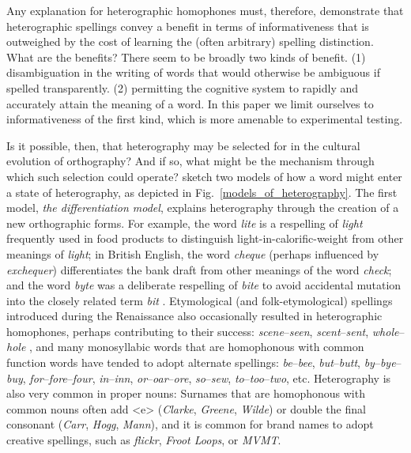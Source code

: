 \documentclass[doc,biblatex]{apa7}
\begin{document}
Any explanation for heterographic homophones must, therefore, demonstrate that heterographic spellings convey a benefit in terms of informativeness that is outweighed by the cost of learning the (often arbitrary) spelling distinction. What are the benefits? There seem to be broadly two kinds of benefit. (1) disambiguation in the writing of words that would otherwise be ambiguous if spelled transparently. (2) permitting the cognitive system to rapidly and accurately attain the meaning of a word. In this paper we limit ourselves to informativeness of the first kind, which is more amenable to experimental testing.

Is it possible, then, that heterography may be selected for in the cultural evolution of orthography? And if so, what might be the mechanism through which such selection could operate? \textcite[pp.~325--326]{Berg:2021} sketch two models of how a word might enter a state of heterography, as depicted in Fig.~\ref{models_of_heterography}. The first model, \textit{the differentiation model}, explains heterography through the creation of a new orthographic forms. For example, the word \textit{lite} is a respelling of \textit{light} frequently used in food products to distinguish light-in-calorific-weight from other meanings of \textit{light}; in British English, the word \textit{cheque} (perhaps influenced by \textit{exchequer}) differentiates the bank draft from other meanings of the word \textit{check}; and the word \textit{byte} was a deliberate respelling of \textit{bite} to avoid accidental mutation into the closely related term \textit{bit} \parencite{Buchholz:1977}. Etymological (and folk-etymological) spellings introduced during the Renaissance also occasionally resulted in heterographic homophones, perhaps contributing to their success: \textit{scene}--\textit{seen}, \textit{scent}--\textit{sent}, \textit{whole}--\textit{hole} \parencite[pp.~58--59]{Scragg:1974}, and many monosyllabic words that are homophonous with common function words have tended to adopt alternate spellings: \textit{be}--\textit{bee}, \textit{but}--\textit{butt}, \textit{by}--\textit{bye}--\textit{buy}, \textit{for}--\textit{fore}--\textit{four}, \textit{in}--\textit{inn}, \textit{or}--\textit{oar}--\textit{ore}, \textit{so}--\textit{sew}, \textit{to}--\textit{too}--\textit{two}, etc. Heterography is also very common in proper nouns: Surnames that are homophonous with common nouns often add <e> (\textit{Clarke}, \textit{Greene}, \textit{Wilde}) or double the final consonant (\textit{Carr}, \textit{Hogg}, \textit{Mann}), and it is common for brand names to adopt creative spellings, such as \textit{flickr}, \textit{Froot Loops}, or \textit{MVMT}.
\end{document}
